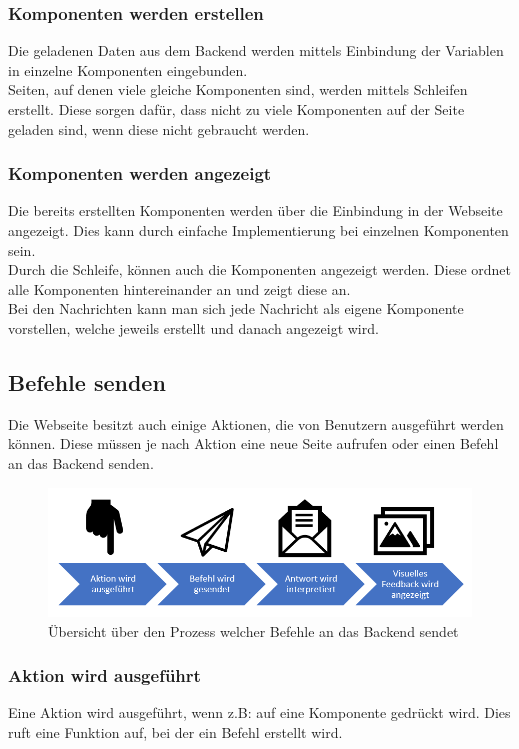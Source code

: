 \subsubsection{Komponenten werden erstellen}
Die geladenen Daten aus dem Backend werden mittels Einbindung der Variablen in einzelne Komponenten eingebunden.\\
Seiten, auf denen viele gleiche Komponenten sind, werden mittels Schleifen erstellt. Diese sorgen dafür, dass nicht zu viele Komponenten auf der Seite geladen sind, wenn diese nicht gebraucht werden.

\subsubsection{Komponenten werden angezeigt}
Die bereits erstellten Komponenten werden über die Einbindung in der Webseite angezeigt. Dies kann durch einfache Implementierung bei einzelnen Komponenten sein.\\
Durch die Schleife, können auch die Komponenten angezeigt werden. Diese ordnet alle Komponenten hintereinander an und zeigt diese an.\\
Bei den Nachrichten kann man sich jede Nachricht als eigene Komponente vorstellen, welche jeweils erstellt und danach angezeigt wird.
\newpage
\subsection{Befehle senden}
Die Webseite besitzt auch einige Aktionen, die von Benutzern ausgeführt werden können. Diese müssen je nach Aktion eine neue Seite aufrufen oder einen Befehl an das Backend senden.

\begin{figure}[H]
	\centering
	\includegraphics[width=0.8\linewidth]{images/Prozess_Befehl_senden}
	\caption[Prozess der Befehlssendung]{Übersicht über den Prozess welcher Befehle an das Backend sendet}
	\label{fig:prozessbefehlsenden}
\end{figure}

\subsubsection{Aktion wird ausgeführt}
Eine Aktion wird ausgeführt, wenn z.B: auf eine Komponente gedrückt wird. Dies ruft eine Funktion auf, bei der ein Befehl erstellt wird.

